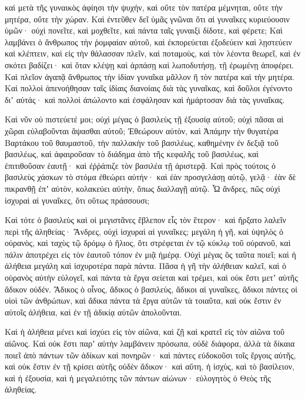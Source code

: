 {καὶ μετὰ τῆς γυναικὸς ἀφίησι τὴν ψυχήν, καὶ οὔτε τὸν πατέρα μέμνηται, οὔτε τὴν μητέρα, οὔτε τὴν χώραν.
Καὶ ἐντεῦθεν δεῖ ὑμᾶς γνῶναι ὅτι αἱ γυναῖκες κυριεύουσιν ὑμῶν· οὐχὶ πονεῖτε, καὶ μοχθεῖτε, καὶ πάντα ταῖς γυναιξὶ δίδοτε, καὶ φέρετε;
Καὶ λαμβάνει ὁ ἄνθρωπος τὴν ῥομφαίαν αὐτοῦ, καὶ ἐκπορεύεται ἐξοδεύειν καὶ λῃστεύειν καὶ κλέπτειν, καὶ εἰς τὴν θάλασσαν πλεῖν, καὶ ποταμοὺς,
καὶ τὸν λέοντα θεωρεῖ, καὶ ἐν σκότει βαδίζει· καὶ ὅταν κλέψῃ καὶ ἁρπάσῃ καὶ λωποδυτήσῃ, τῇ ἐρωμένῃ ἀποφέρει.
Καὶ πλεῖον ἀγαπᾷ ἄνθρωπος τὴν ἰδίαν γυναῖκα μᾶλλον ἢ τὸν πατέρα καὶ τὴν μητέρα.
Καὶ πολλοὶ ἀπενοήθησαν ταῖς ἰδίαις διανοίαις διὰ τὰς γυναῖκας, καὶ δοῦλοι ἐγένοντο διʼ αὐτάς·
καὶ πολλοὶ ἀπώλοντο καὶ ἐσφάλησαν καὶ ἡμάρτοσαν διὰ τὰς γυναῖκας.
\par }{\PP {}Καὶ νῦν οὐ πιστεύετέ μοι; οὐχὶ μέγας ὁ βασιλεὺς τῇ ἐξουσίᾳ αὐτοῦ; οὐχὶ πᾶσαι αἱ χῶραι εὐλαβοῦνται ἅψασθαι αὐτοῦ;
Ἐθεώρουν αὐτὸν, καὶ Ἀπάμην τὴν θυγατέρα Βαρτάκου τοῦ θαυμαστοῦ, τὴν παλλακὴν τοῦ βασιλέως, καθημένην ἐν δεξιᾷ τοῦ βασιλέως,
καὶ ἀφαιροῦσαν τὸ διάδημα ἀπὸ τῆς κεφαλῆς τοῦ βασιλέως, καὶ ἐπιτιθοῦσαν ἑαυτῇ· καὶ ἐῤῥάπιζε τὸν βασιλέα τῇ ἀριστερᾷ.
Καὶ πρὸς τούτοις ὁ βασιλεὺς χάσκων τὸ στόμα ἐθεώρει αὐτήν· καὶ ἐὰν προσγελάσῃ αὐτῷ, γελᾷ· ἐὰν δὲ πικρανθῇ ἐπʼ αὐτὸν, κολακεύει αὐτὴν, ὅπως διαλλαγῇ αὐτῷ.
Ὦ ἄνδρες, πῶς οὐχὶ ἰσχυραὶ αἱ γυναῖκες, ὅτι οὕτως πράσσουσι;
\par }{\PP {}Καὶ τότε ὁ βασιλεὺς καὶ οἱ μεγιστᾶνες ἔβλεπον εἷς τὸν ἕτερον· καὶ ἤρξατο λαλεῖν περὶ τῆς ἀληθείας·
Ἄνδρες, οὐχὶ ἰσχυραὶ αἱ γυναῖκες; μεγάλη ἡ γῆ, καὶ ὑψηλὸς ὁ οὐρανὸς, καὶ ταχὺς τῷ δρόμῳ ὁ ἥλιος, ὅτι στρέφεται ἐν τῷ κύκλῳ τοῦ οὐρανοῦ, καὶ πάλιν ἀποτρέχει εἰς τὸν ἑαυτοῦ τόπον ἐν μιᾷ ἡμέρᾳ.
Οὐχὶ μέγας ὃς ταῦτα ποιεῖ; καὶ ἡ ἀλήθεια μεγάλη καὶ ἰσχυροτέρα παρὰ πάντα.
Πᾶσα ἡ γῆ τὴν ἀλήθειαν καλεῖ, καὶ ὁ οὐρανὸς αὐτὴν εὐλογεῖ, καὶ πάντα τὰ ἔργα σείεται καὶ τρέμει, καὶ οὐκ ἔστι μετʼ αὐτῆς ἄδικον οὐδέν.
Ἄδικος ὁ οἶνος, ἄδικος ὁ βασιλεὺς, ἄδικοι αἱ γυναῖκες, ἄδικοι πάντες οἱ υἱοὶ τῶν ἀνθρώπων, καὶ ἄδικα πάντα τὰ ἔργα αὐτῶν τὰ τοιαῦτα, καὶ οὐκ ἔστιν ἐν αὐτοῖς ἀλήθεια, καὶ ἐν τῇ ἀδικίᾳ αὐτῶν ἀπολοῦνται.
\par }{\PP {}Καὶ ἡ ἀλήθεια μένει καὶ ἰσχύει εἰς τὸν αἰῶνα, καὶ ζῇ καὶ κρατεῖ εἰς τὸν αἰῶνα τοῦ αἰῶνος.
Καὶ οὐκ ἔστι παρʼ αὐτὴν λαμβάνειν πρόσωπα, οὐδὲ διάφορα, ἀλλὰ τὰ δίκαια ποιεῖ ἀπὸ πάντων τῶν ἀδίκων καὶ πονηρῶν· καὶ πάντες εὐδοκοῦσι τοῖς ἔργοις αὐτῆς,
καὶ οὐκ ἔστιν ἐν τῇ κρίσει αὐτῆς οὐδὲν ἄδικον· καὶ αὕτη, ἡ ἰσχὺς, καὶ τὸ βασίλειον, καὶ ἡ ἐξουσία, καὶ ἡ μεγαλειότης τῶν πάντων αἰώνων· εὐλογητὸς ὁ Θεὸς τῆς ἀληθείας.
}
